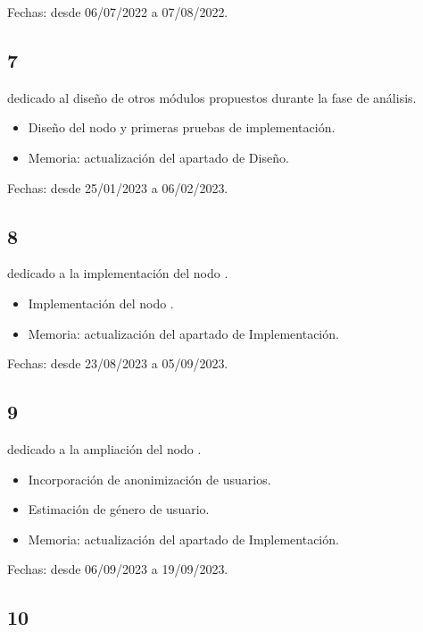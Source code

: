 Fechas: desde 06/07/2022 a 07/08/2022.

\subsection{ 7}

 dedicado al diseño de otros módulos propuestos durante la fase de análisis. 

\begin{itemize}
	\item Diseño del nodo  y primeras pruebas de implementación. 
	\item Memoria: actualización del apartado de Diseño.
\end{itemize}

Fechas: desde 25/01/2023 a 06/02/2023.

\subsection{ 8}

 dedicado a la implementación del nodo . 

\begin{itemize}
	\item Implementación del nodo . 
	\item Memoria: actualización del apartado de Implementación. 
\end{itemize}

Fechas: desde 23/08/2023 a 05/09/2023.

\subsection{ 9}

 dedicado a la ampliación del nodo . 

\begin{itemize}
	\item Incorporación de anonimización de usuarios.
	\item Estimación de género de usuario. 
	\item Memoria: actualización del apartado de Implementación. 
\end{itemize}

Fechas: desde 06/09/2023 a 19/09/2023.

\subsection{ 10}

